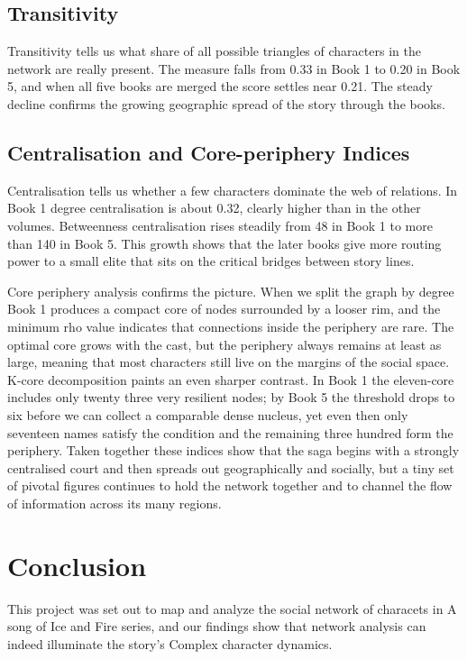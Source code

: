 \documentclass[12pt, a4paper]{article}
\begin{document}
\subsection*{Transitivity}
Transitivity tells us what share of all possible triangles of characters in the network are really present. The measure falls from 0.33 in Book 1 to 0.20 in Book 5, and when all five books are merged the score settles near 0.21. The steady decline confirms the growing geographic spread of the story through the books. 


\subsection*{Centralisation and Core-periphery Indices}
Centralisation tells us whether a few characters dominate the web of relations. In Book 1 degree centralisation is about 0.32, clearly higher than in the other volumes. Betweenness centralisation rises steadily from 48 in Book 1 to more than 140 in Book 5. This growth shows that the later books give more routing power to a small elite that sits on the critical bridges between story lines.

Core periphery analysis confirms the picture. 
When we split the graph by degree Book 1 produces a compact core of nodes surrounded by a looser rim, and the minimum rho value indicates that connections inside the periphery are rare. The optimal core grows with the cast, but the periphery always remains at least as large, meaning that most characters still live on the margins of the social space. 
K-core decomposition paints an even sharper contrast. 
In Book 1 the eleven-core includes only twenty three very resilient nodes; by Book 5 the threshold drops to six before we can collect a comparable dense nucleus, yet even then only seventeen names satisfy the condition and the remaining three hundred form the periphery. Taken together these indices show that the saga begins with a strongly centralised court and then spreads out geographically and socially, but a tiny set of pivotal figures continues to hold the network together and to channel the flow of information across its many regions.
  
\section{Conclusion}
\label{conclusion}

This project was set out to map and analyze the social network of characets in A song of Ice and Fire series, and our findings show that network analysis can indeed illuminate the story's Complex character dynamics.
\end{document}
